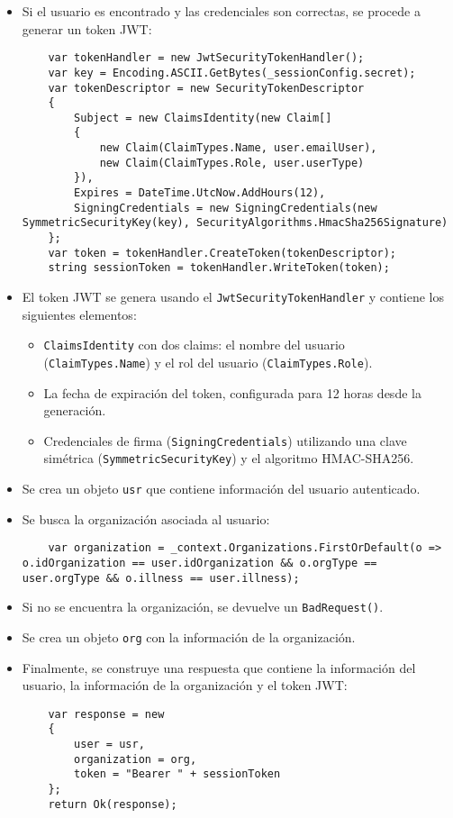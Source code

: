 \begin{itemize}
\begin{itemize}
    \end{itemize}
    \item Si el usuario es encontrado y las credenciales son correctas, se procede a generar un token JWT:
    \begin{lstlisting}
    var tokenHandler = new JwtSecurityTokenHandler();
    var key = Encoding.ASCII.GetBytes(_sessionConfig.secret);
    var tokenDescriptor = new SecurityTokenDescriptor
    {
        Subject = new ClaimsIdentity(new Claim[]
        {
            new Claim(ClaimTypes.Name, user.emailUser),
            new Claim(ClaimTypes.Role, user.userType)
        }),
        Expires = DateTime.UtcNow.AddHours(12),
        SigningCredentials = new SigningCredentials(new SymmetricSecurityKey(key), SecurityAlgorithms.HmacSha256Signature)
    };
    var token = tokenHandler.CreateToken(tokenDescriptor);
    string sessionToken = tokenHandler.WriteToken(token);
    \end{lstlisting}
    \item El token JWT se genera usando el \texttt{JwtSecurityTokenHandler} y contiene los siguientes elementos:
    \begin{itemize}
        \item \texttt{ClaimsIdentity} con dos claims: el nombre del usuario (\texttt{ClaimTypes.Name}) y el rol del usuario (\texttt{ClaimTypes.Role}).
        \item La fecha de expiración del token, configurada para 12 horas desde la generación.
        \item Credenciales de firma (\texttt{SigningCredentials}) utilizando una clave simétrica (\texttt{SymmetricSecurityKey}) y el algoritmo HMAC-SHA256.
    \end{itemize}
    \item Se crea un objeto \texttt{usr} que contiene información del usuario autenticado.
    \item Se busca la organización asociada al usuario:
    \begin{lstlisting}
    var organization = _context.Organizations.FirstOrDefault(o => o.idOrganization == user.idOrganization && o.orgType == user.orgType && o.illness == user.illness);
    \end{lstlisting}
    \item Si no se encuentra la organización, se devuelve un \texttt{BadRequest()}.
    \item Se crea un objeto \texttt{org} con la información de la organización.
    \item Finalmente, se construye una respuesta que contiene la información del usuario, la información de la organización y el token JWT:
    \begin{lstlisting}
    var response = new
    {
        user = usr,
        organization = org,
        token = "Bearer " + sessionToken
    };
    return Ok(response);
    \end{lstlisting}
\end{itemize}

